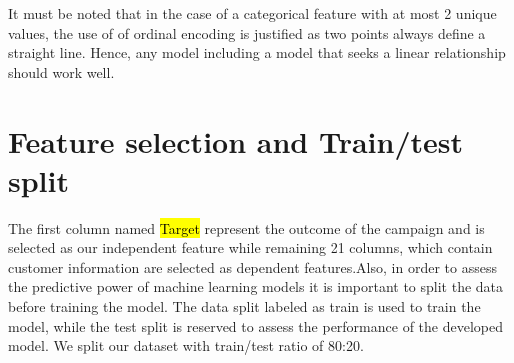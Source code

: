 It must be noted that in the case of a categorical feature with at most 2 unique values, the use of of ordinal encoding is justified as two points always define a straight line. Hence, any model including a model that seeks a linear relationship should work well.

\section{Feature selection and Train/test split}

The first column named \hl{Target} represent the outcome of the campaign and is selected as our independent feature while remaining 21 columns, which contain customer information are selected as dependent features.Also, in order to assess the predictive power of machine learning models it is important to split the data before training the model. The data split labeled as train is used to train the model, while the test split is reserved to assess the performance of the developed model. We split our dataset with train/test ratio of 80:20.






